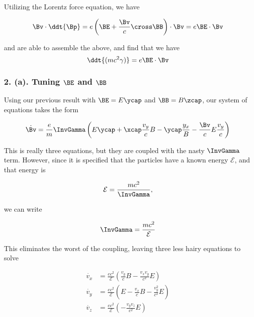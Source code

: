 Utilizing the Lorentz force equation, we have

\begin{equation}\label{eqn:relElectroDynProblemSet2:250}
\Bv \cdot \ddt{\Bp} = e \left( \BE + \frac{\Bv}{c} \cross \BB \right) \cdot \Bv = e \BE \cdot \Bv
\end{equation}

and are able to assemble the above, and find that we have
\begin{equation}\label{eqn:relElectroDynProblemSet2:270}
\ddt{(m c^2 \gamma)} = e \BE \cdot \Bv 
\end{equation}

\subsubsection{2. (a). Tuning $\BE$ and $\BB$}

Using our previous result with $\BE = E \ycap$ and $\BB = B \zcap$, our system of equations takes the form

\begin{equation}\label{eqn:relElectroDynProblemSet2:290}
\dot{\Bv} = \frac{e}{m} \InvGamma \left( E \ycap + \xcap \frac{v_y}{c} B - \ycap \frac{y_x} B - \frac{\Bv}{c} E \frac{v_y}{c} \right)
\end{equation}

This is really three equations, but they are coupled with the nasty $\InvGamma$ term.  However, since it is specified that the particles have a known energy $\mathcal{E}$, and that energy is

\begin{equation}\label{eqn:relElectroDynProblemSet2:310}
\mathcal{E} = \frac{ m c^2 }{\InvGamma},
\end{equation}

we can write

\begin{equation}\label{eqn:relElectroDynProblemSet2:330}
\InvGamma = \frac{ m c^2 }{\mathcal{E}}
\end{equation}

This eliminates the worst of the coupling, leaving three less hairy equations to solve

\begin{align}\label{eqn:relElectroDynProblemSet2:350}
\dot{v_x} &= \frac{e c^2}{\mathcal{E}} \left( \frac{v_y}{c} B - \frac{v_x v_y}{c^2} E \right) \\
\dot{v_y} &= \frac{e c^2}{\mathcal{E}} \left( E - \frac{v_x}{c} B - \frac{v_y^2}{c^2} E \right) \\
\dot{v_z} &= \frac{e c^2}{\mathcal{E}} \left( - \frac{v_y v_z}{c^2} E \right)
\end{align}

